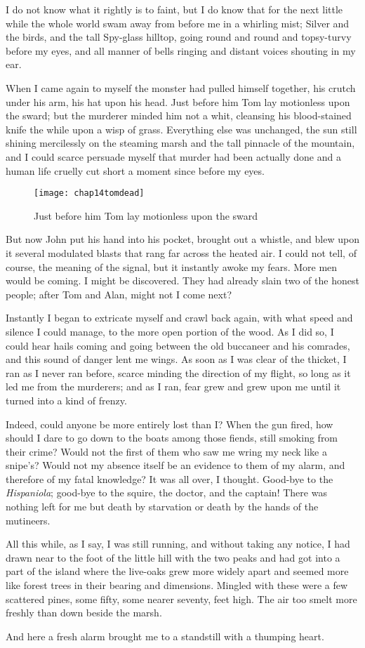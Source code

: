 I do not know what it rightly is to faint, but I do know that for the next little while the whole world swam away from before me in a whirling mist; Silver and the birds, and the tall Spy-glass hilltop, going round and round and topsy-turvy before my eyes, and all manner of bells ringing and distant voices shouting in my ear.

When I came again to myself the monster had pulled himself together, his crutch under his arm, his hat upon his head. Just before him Tom lay motionless upon the sward; but the murderer minded him not a whit, cleansing his blood-stained knife the while upon a wisp of grass. Everything else was unchanged, the sun still shining mercilessly on the steaming marsh and the tall pinnacle of the mountain, and I could scarce persuade myself that murder had been actually done and a human life cruelly cut short a moment since before my eyes.

 \begin{figure}[p]
\centering
\texttt{[image: chap14tomdead]}
\caption[\textbf{Tom lay motionless upon the sward}]{Just before him Tom lay motionless upon the sward}
\end{figure}

But now John put his hand into his pocket, brought out a whistle, and blew upon it several modulated blasts that rang far across the heated air. I could not tell, of course, the meaning of the signal, but it instantly awoke my fears. More men would be coming. I might be discovered. They had already slain two of the honest people; after Tom and Alan, might not I come next?

Instantly I began to extricate myself and crawl back again, with what speed and silence I could manage, to the more open portion of the wood. As I did so, I could hear hails coming and going between the old buccaneer and his comrades, and this sound of danger lent me wings. As soon as I was clear of the thicket, I ran as I never ran before, scarce minding the direction of my flight, so long as it led me from the murderers; and as I ran, fear grew and grew upon me until it turned into a kind of frenzy.

Indeed, could anyone be more entirely lost than I? When the gun fired, how should I dare to go down to the boats among those fiends, still smoking from their crime? Would not the first of them who saw me wring my neck like a snipe's? Would not my absence itself be an evidence to them of my alarm, and therefore of my fatal knowledge? It was all over, I thought. Good-bye to the \textit{Hispaniola}; good-bye to the squire, the doctor, and the captain! There was nothing left for me but death by starvation or death by the hands of the mutineers.

All this while, as I say, I was still running, and without taking any notice, I had drawn near to the foot of the little hill with the two peaks and had got into a part of the island where the live-oaks grew more widely apart and seemed more like forest trees in their bearing and dimensions. Mingled with these were a few scattered pines, some fifty, some nearer seventy, feet high. The air too smelt more freshly than down beside the marsh.

And here a fresh alarm brought me to a standstill with a thumping heart.